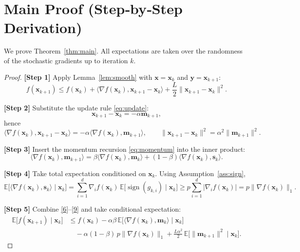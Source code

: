 \documentclass{article}
\newcommand{\sgn}{\operatorname{sign}}
\begin{document}
\section*{Main Proof (Step‑by‑Step Derivation)}
We prove Theorem~\ref{thm:main}.  All expectations are taken over the randomness of the stochastic gradients up to iteration $k$.

\begin{proof}
\textbf{[Step 1]} Apply Lemma~\ref{lem:smooth} with $\mathbf{x}=\mathbf{x}_{k}$ and $\mathbf{y}=\mathbf{x}_{k+1}$:
\[
f(\mathbf{x}_{k+1})\le f(\mathbf{x}_{k})+\langle\nabla f(\mathbf{x}_{k}),\mathbf{x}_{k+1}-\mathbf{x}_{k}\rangle
+\frac{L}{2}\|\mathbf{x}_{k+1}-\mathbf{x}_{k}\|^{2}.
\tag{6}
\]

\textbf{[Step 2]} Substitute the update rule \eqref{eq:update}:
\[
\mathbf{x}_{k+1}-\mathbf{x}_{k}= -\alpha\mathbf{m}_{k+1},
\]
hence
\[
\langle\nabla f(\mathbf{x}_{k}),\mathbf{x}_{k+1}-\mathbf{x}_{k}\rangle
= -\alpha\langle\nabla f(\mathbf{x}_{k}),\mathbf{m}_{k+1}\rangle,
\qquad
\|\mathbf{x}_{k+1}-\mathbf{x}_{k}\|^{2}= \alpha^{2}\|\mathbf{m}_{k+1}\|^{2}.
\tag{7}
\]

\textbf{[Step 3]} Insert the momentum recursion \eqref{eq:momentum} into the inner product:
\[
\langle\nabla f(\mathbf{x}_{k}),\mathbf{m}_{k+1}\rangle
= \beta\langle\nabla f(\mathbf{x}_{k}),\mathbf{m}_{k}\rangle
+ (1-\beta)\langle\nabla f(\mathbf{x}_{k}),\mathbf{s}_{k}\rangle.
\tag{8}
\]

\textbf{[Step 4]} Take total expectation conditioned on $\mathbf{x}_{k}$.
Using Assumption~\ref{ass:sign},
\[
\mathbb{E}\big[\langle\nabla f(\mathbf{x}_{k}),\mathbf{s}_{k}\rangle\mid\mathbf{x}_{k}\big]
= \sum_{i=1}^{d}\nabla_{i}f(\mathbf{x}_{k})\,
\mathbb{E}\big[\sgn(g_{k,i})\mid\mathbf{x}_{k}\big]
\ge p\sum_{i=1}^{d}|\nabla_{i}f(\mathbf{x}_{k})|
= p\|\nabla f(\mathbf{x}_{k})\|_{1}.
\tag{9}
\]

\textbf{[Step 5]} Combine \eqref{6}–\eqref{9} and take conditional expectation:
\[
\begin{aligned}
\mathbb{E}\big[f(\mathbf{x}_{k+1})\mid\mathbf{x}_{k}\big]
&\le f(\mathbf{x}_{k})
-\alpha\beta\,\mathbb{E}\big[\langle\nabla f(\mathbf{x}_{k}),\mathbf{m}_{k}\rangle\mid\mathbf{x}_{k}\big] \\
&\quad -\alpha(1-\beta)\,p\|\nabla f(\mathbf{x}_{k})\|_{1}
+\frac{L\alpha^{2}}{2}\,\mathbb{E}\big[\|\mathbf{m}_{k+1}\|^{2}\mid\mathbf{x}_{k}\big].
\end{aligned}
\tag{10}
\]


\end{proof}
\end{document}
